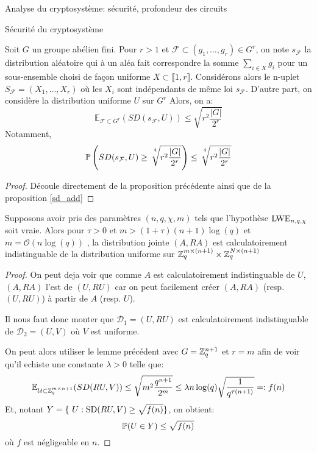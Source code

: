 \begin{section}{Analyse du cryptosystème: sécurité, profondeur des circuits}
\begin{subsection}{Sécurité du cryptosystème}
	\begin{cor}
	Soit $G$ un groupe abélien fini. Pour $r > 1$ et 
	$\mathcal{F} \subset (g_1, \ldots, g_r) \in G^r$, on
	note
	 $s_\mathcal{F}$ la distribution aléatoire qui à un aléa
	 fait correspondre la somme $\sum_{i\in X} g_i$ pour un
	 sous-ensemble choisi de façon uniforme  $X\subset \llbracket
	 1, r \rrbracket$. 
	 Considérons alors le n-uplet $S_\mathcal{F} = (X_1, \ldots, X_r)$ où 
	 les $X_i$ sont indépendants de même loi
	 $s_\mathcal{F}$.
	 D'autre part, on considère la distribution uniforme
	 $U$ sur $G^r$
	 Alors, on a: 
	 \[\mathbb{E}_{\mathcal{F}\subset G^r}(SD(s_\mathcal{F},U)) \leq 
	   \sqrt{r^2\frac{|G|}{2^r}}\]
	 Notamment, 
	 \[\mathbb{P}\left(SD(s_\mathcal{F},U) \geq
		 \sqrt[\leftroot{-3}\uproot{8}4\:]{r^2\frac{|G|}{2^r}} \right) \leq
		 \sqrt[\leftroot{-3}\uproot{8}4\:]{r^2\frac{|G|}{2^r}}
	 \]
	\end{cor}
	\begin{proof}
		Découle directement de la proposition précédente ainsi que de
		la proposition \ref{sd_add}
	\end{proof}

	\begin{prop}
	Supposons avoir pris des paramètres $(n, q, \chi, m)$
	tels que l'hypothèse $\text{LWE}_{n,q,\chi}$ soit vraie. Alors pour $\tau >0$
	et $m > (1+\tau)(n+1)\log(q)$ et $m = \mathcal{O}(n\log(q))$ , la distribution jointe
	$(A, RA)$ est calculatoirement indistinguable de la
	distribution uniforme sur $\mathbb{Z}_q^{m \times (n+1)} \times \mathbb{Z}_q^{N
	\times (n+1)}$
	\end{prop}
	\begin{proof}
	On peut deja voir que comme $A$ est calculatoirement
	indistinguable de $U$, $(A, RA)$ l'est de $(U,RU)$ car on 
	peut facilement créer $(A, RA)$ (resp. $(U, RU)$) à partir de
	$A$ (resp. $U$).

	Il nous faut donc monter que $\mathcal{D}_1 = (U, RU)$ est calculatoirement
	indistinguable de $\mathcal{D}_2 = (U, V)$ où $V$ est uniforme.
	
	On peut alors utiliser le lemme précédent avec $G = \mathbb{Z}_q^{n+1}$
	et $r = m$ afin de voir qu'il echiste une constante $\lambda > 0$
	telle que:
	\[\mathbb{E}_{\mathcal{U}\subset \mathbb{Z}_q^{m\times n+1}}(SD(RU,V)) \leq 
		\sqrt{m^2\frac{q^{n+1}}{2^m}}\leq \lambda
	n\log(q)\sqrt{\frac{1}{q^{\tau(n+1)}}}=: f(n) \]
	Et, notant $Y = \{ U: \SD(RU,V) \geq \sqrt{f(n)}\}$, on obtient:
	\[\mathbb{P}(U \in Y) \leq \sqrt{f(n)} \]
	où $f$ est négligeable en $n$. 




\end{proof}
\end{subsection}
\end{section}
